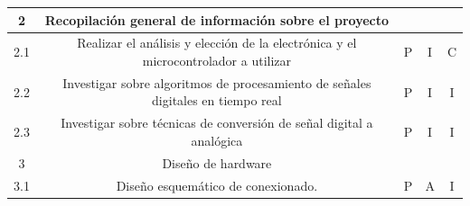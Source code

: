 \documentclass[11pt]{charter}
\begin{document}
\begin{table}[]
\begin{tabular}{|c|c|c|c|c|}
\rowcolor[HTML]{CBCEFB} 
2                                                                                              & Recopilación general de información sobre el proyecto                              &                                                                             &                                                                    &                                                                      \\ \hline
2.1                                                                                            & Realizar el análisis y elección de la electrónica y el microcontrolador a utilizar & P                                                                           & I                                                                  & C                                                                    \\ \hline
2.2                                                                                            & Investigar sobre algoritmos de procesamiento de señales digitales en tiempo real   & P                                                                           & I                                                                  & I                                                                    \\ \hline
2.3                                                                                            & Investigar sobre técnicas de conversión de señal digital a analógica               & P                                                                           & I                                                                  & I                                                                    \\ \hline
\rowcolor[HTML]{CBCEFB} 
3                                                                                              & Diseño de hardware                                                                 &                                                                             &                                                                    &                                                                      \\ \hline
3.1                                                                                            & Diseño esquemático de conexionado.                                                 & P                                                                           & A                                                                  & I                                                                    \\ \hline

\end{tabular}
\end{table}
\end{document}
